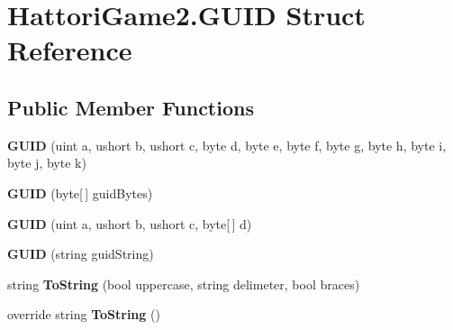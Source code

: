 \hypertarget{struct_hattori_game2_1_1_g_u_i_d}{}\section{Hattori\+Game2.\+G\+U\+I\+D Struct Reference}
\label{struct_hattori_game2_1_1_g_u_i_d}
\subsection*{Public Member Functions}
\begin{DoxyCompactItemize}
\item 
\hypertarget{struct_hattori_game2_1_1_g_u_i_d_a63cb3c814a7f7530f9998ca096f16ecf}{}{\bfseries G\+U\+I\+D} (uint a, ushort b, ushort c, byte d, byte e, byte f, byte g, byte h, byte i, byte j, byte k)\label{struct_hattori_game2_1_1_g_u_i_d_a63cb3c814a7f7530f9998ca096f16ecf}

\item 
\hypertarget{struct_hattori_game2_1_1_g_u_i_d_a2df019aa7d6a0cf855609ee5e9c262d7}{}{\bfseries G\+U\+I\+D} (byte\mbox{[}$\,$\mbox{]} guid\+Bytes)\label{struct_hattori_game2_1_1_g_u_i_d_a2df019aa7d6a0cf855609ee5e9c262d7}

\item 
\hypertarget{struct_hattori_game2_1_1_g_u_i_d_ad82a4e42acad0ef4d515f044f95edd5a}{}{\bfseries G\+U\+I\+D} (uint a, ushort b, ushort c, byte\mbox{[}$\,$\mbox{]} d)\label{struct_hattori_game2_1_1_g_u_i_d_ad82a4e42acad0ef4d515f044f95edd5a}

\item 
\hypertarget{struct_hattori_game2_1_1_g_u_i_d_a0de7c37a87c0c7e978bd1a8638bce798}{}{\bfseries G\+U\+I\+D} (string guid\+String)\label{struct_hattori_game2_1_1_g_u_i_d_a0de7c37a87c0c7e978bd1a8638bce798}

\item 
\hypertarget{struct_hattori_game2_1_1_g_u_i_d_af2cff5b8938efec6b1c6b09c93f46521}{}string {\bfseries To\+String} (bool uppercase, string delimeter, bool braces)\label{struct_hattori_game2_1_1_g_u_i_d_af2cff5b8938efec6b1c6b09c93f46521}

\item 
\hypertarget{struct_hattori_game2_1_1_g_u_i_d_a8888eb61549395fff323fde1ca586e6c}{}override string {\bfseries To\+String} ()\label{struct_hattori_game2_1_1_g_u_i_d_a8888eb61549395fff323fde1ca586e6c}

\end{DoxyCompactItemize}
